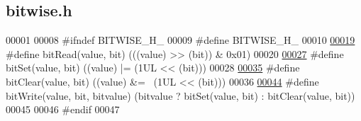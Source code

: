\hypertarget{bitwise_8h_source}{}\subsection{bitwise.\+h}
\label{bitwise_8h_source}

\begin{DoxyCode}
00001 
00008 \textcolor{preprocessor}{#ifndef BITWISE\_H\_}
00009 \textcolor{preprocessor}{#define BITWISE\_H\_}
00010 
\hypertarget{bitwise_8h_source.tex_l00019}{}\hyperlink{bitwise_8h_aff20d8c0a05ad3043afa2e4ad9ebe768}{00019} \textcolor{preprocessor}{#define bitRead(value, bit) (((value) >> (bit)) & 0x01)}
00020 
\hypertarget{bitwise_8h_source.tex_l00027}{}\hyperlink{bitwise_8h_a6a8195c0e930f86c6af03ba6af8b41dd}{00027} \textcolor{preprocessor}{#define bitSet(value, bit) ((value) |= (1UL << (bit)))}
00028 
\hypertarget{bitwise_8h_source.tex_l00035}{}\hyperlink{bitwise_8h_abbe843c0521806a4ab2e7cffe44769e2}{00035} \textcolor{preprocessor}{#define bitClear(value, bit) ((value) &= ~(1UL << (bit)))}
00036 
\hypertarget{bitwise_8h_source.tex_l00044}{}\hyperlink{bitwise_8h_a42c17f59f3f9a3112d01246760067a8e}{00044} \textcolor{preprocessor}{#define bitWrite(value, bit, bitvalue) (bitvalue ? bitSet(value, bit) : bitClear(value, bit))}
00045 
00046 \textcolor{preprocessor}{#endif}
00047 
\end{DoxyCode}
